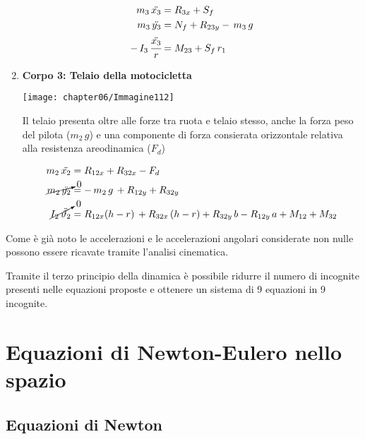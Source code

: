 \begin{enumerate}
\begin{minipage}{.65\textwidth}
\begin{align*}
m_3\,\ddot{x_3} &= R_{3x} + S_f\\
m_3\,\ddot{y_3} &= N_f + R_{23y} -\,m_3\,g\\
-\,I_3\,\cfrac{\ddot{x_3}}{r} &= M_{23} + S_f\,r_1
\end{align*}
\end{minipage}
\newpage

\item \textbf{Corpo 3: Telaio della motocicletta}

\begin{center}
	\texttt{[image: chapter06/Immagine112]}
\end{center}

Il telaio presenta oltre alle forze tra ruota e telaio stesso, anche la forza peso del pilota ($m_2\,g$) e una componente di forza consierata orizzontale relativa alla resistenza areodinamica ($F_d$)

\begin{align*}
	m_2\,\ddot{x_2} &= R_{12x} + R_{32x} - F_d\\
	\cancelto{0}{m_2\,\ddot{y_2}} &=  -\,m_2\,g\,+R_{12y} + R_{32y}\\
	\cancelto{0}{I_2\,\ddot{\theta_2}} &= R_{12x}(h-r)\,+R_{32x}\,(h-r) + R_{32y}\,b - R_{12y}\,a + M_{12} + M_{32}
\end{align*}
\end{enumerate}

Come è già noto le accelerazioni e le accelerazioni angolari considerate non nulle possono essere ricavate tramite l'analisi cinematica.

Tramite il terzo principio della dinamica è possibile ridurre il numero di incognite presenti nelle equazioni proposte e ottenere un sistema di 9 equazioni in 9 incognite.

\newpage
\section{Equazioni di Newton-Eulero nello spazio}

	\subsection{Equazioni di Newton}
	
